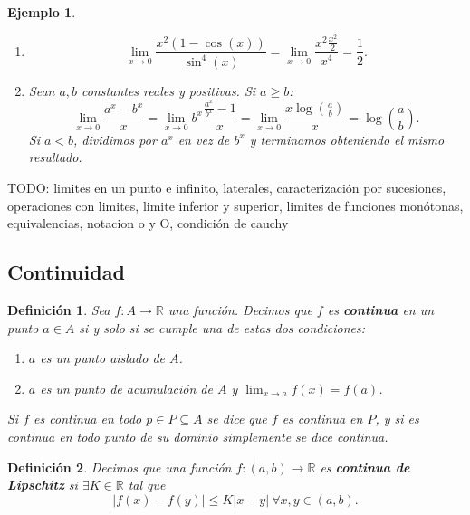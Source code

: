 \documentclass{article}
\newtheorem{define}{Definición}
\newtheorem{ejem}{Ejemplo}
\newcommand{\reales}{\mathbb{R}}
\begin{document}
\begin{ejem}
	\begin{enumerate}
		\item
		\begin{equation*}
			\lim_{x\rightarrow 0} \frac{x^2(1-\cos(x))}{\sin^4(x)} = \lim_{x\rightarrow 0} \frac{x^2 \frac{x^2}{2}}{x^4} = \frac{1}{2}.
		\end{equation*}
		\item
		Sean $a, b$ constantes reales y positivas. Si $a \geq b$:
		\begin{equation*}
			\lim_{x\rightarrow 0} \frac{a^x - b^x}{x} = \lim_{x\rightarrow 0} b^x \frac{\frac{a^x}{b^x} - 1}{x} = \lim_{x\rightarrow 0} \frac{x\log(\frac{a}{b})}{x} = \log(\frac{a}{b}).
		\end{equation*}
		Si $a < b$, dividimos por $a^x$ en vez de $b^x$ y terminamos obteniendo el mismo resultado.
	\end{enumerate}
\end{ejem}

TODO: limites en un punto e infinito, laterales, caracterización por sucesiones, operaciones con limites, limite inferior y superior, limites de funciones monótonas, equivalencias, notacion o y O, condición de cauchy

\subsection{Continuidad}
\begin{define}
	Sea $f: A \rightarrow \reales$ una función. Decimos que $f$ es \textbf{continua} en un punto $a \in A$ si y solo si se cumple una de estas dos condiciones:
	\begin{enumerate}
		\item
		$a$ es un punto aislado de $A$.
		\item
		$a$ es un punto de acumulación de $A$ y $\lim_{x \rightarrow a} f(x) = f(a)$.
	\end{enumerate}
	Si $f$ es continua en todo $p \in P \subseteq A$ se dice que $f$ es continua en $P$, y si es continua en todo punto de su dominio simplemente se dice continua.
\end{define}

\begin{define}
	Decimos que una función $f: (a, b) \rightarrow \reales$ es \textbf{continua de Lipschitz} si $\exists K \in \reales$ tal que
	\begin{equation*}
		|f(x) - f(y)| \leq K|x - y|\ \forall x,y \in (a, b).
	\end{equation*}
\end{define}
\end{document}
